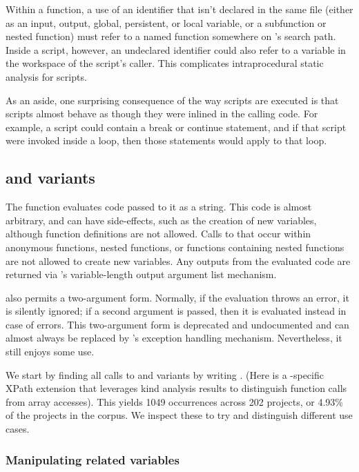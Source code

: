 Within a function, a use of an identifier that isn't declared in the same file
(either as an input, output, global, persistent, or local variable, or a
subfunction or nested function) must refer to a named function somewhere on
\matlab's search path. Inside a script, however, an undeclared identifier could
also refer to a variable in the workspace of the script's caller. This
complicates intraprocedural static analysis for scripts.

As an aside, one surprising consequence of the way scripts are executed is that
scripts almost behave as though they were inlined in the calling code. For
example, a script could contain a break or continue statement, and if that
script were invoked inside a loop, then those statements would apply to that
loop.

\subsection{ and variants}

The  function evaluates \matlab code passed to it as a string. This
code is almost arbitrary, and can have side-effects, such as the creation of
new variables, although function definitions are not allowed. Calls to
 that occur within anonymous functions, nested functions, or
functions containing nested functions are not allowed to create new variables.
Any outputs from the evaluated code are returned via \matlab's variable-length
output argument list mechanism.

 also permits a two-argument form. Normally, if the evaluation
throws an error, it is silently ignored; if a second argument is passed, then
it is evaluated instead in case of errors. This two-argument form is deprecated
and undocumented and can almost always be replaced by \matlab's  exception handling mechanism. Nevertheless, it still enjoys some use.

We start by finding all calls to  and variants by writing
. (Here  is a
\mcbench-specific XPath extension that leverages kind analysis results to
distinguish function calls from array accesses). This yields 1049 occurrences
across 202 projects, or 4.93\% of the projects in the corpus. We inspect these
to try and distinguish different use cases.

\subsubsection{Manipulating related variables}


